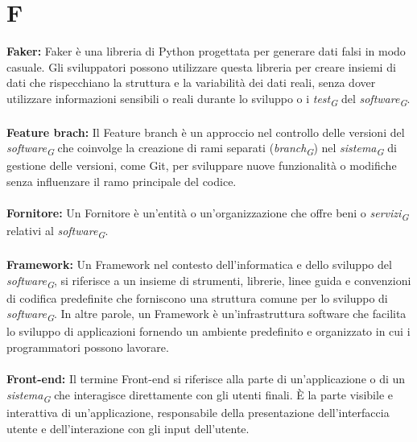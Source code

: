 \documentclass{article}
\begin{document}
\section*{F}
{}
\textbf{Faker:} Faker è una libreria di Python progettata per generare dati falsi in modo casuale. Gli sviluppatori possono utilizzare questa libreria per creare insiemi di dati che rispecchiano la struttura e la variabilità dei dati reali, senza dover utilizzare informazioni sensibili o reali durante lo sviluppo o i \textit{test}\textsubscript{\textit{G}} del \textit{software}\textsubscript{\textit{G}}.
\\
\\
\textbf{Feature brach:} Il Feature branch è un approccio nel controllo delle versioni del \textit{software}\textsubscript{\textit{G}} che coinvolge la creazione di rami separati (\textit{branch}\textsubscript{\textit{G}}) nel \textit{sistema}\textsubscript{\textit{G}} di gestione delle versioni, come Git, per sviluppare nuove funzionalità o modifiche senza influenzare il ramo principale del codice.
\\
\\
\textbf{Fornitore:} Un Fornitore è un'entità o un'organizzazione che offre beni o \textit{servizi}\textsubscript{\textit{G}} relativi al \textit{software}\textsubscript{\textit{G}}.
\\
\\
\textbf{Framework:} Un Framework nel contesto dell'informatica e dello sviluppo del \textit{software}\textsubscript{\textit{G}}, si riferisce a un insieme di strumenti, librerie, linee guida e convenzioni di codifica predefinite che forniscono una struttura comune per lo sviluppo di \textit{software}\textsubscript{\textit{G}}. In altre parole, un Framework è un'infrastruttura software che facilita lo sviluppo di applicazioni fornendo un ambiente predefinito e organizzato in cui i programmatori possono lavorare.
\\
\\
\textbf{Front-end:} Il termine Front-end si riferisce alla parte di un'applicazione o di un \textit{sistema}\textsubscript{\textit{G}} che interagisce direttamente con gli utenti finali. È la parte visibile e interattiva di un'applicazione, responsabile della presentazione dell'interfaccia utente e dell'interazione con gli input dell'utente.
\pagebreak
\end{document}
